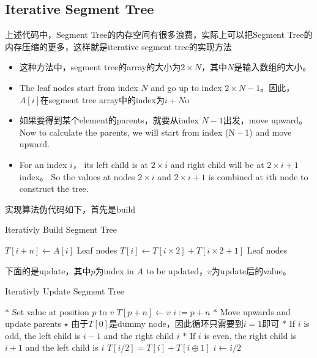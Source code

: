 \subsection{Iterative Segment Tree}
上述代码中，Segment Tree的内存空间有很多浪费，实际上可以把Segment Tree的内存压缩的更多，这样就是iterative segment tree的实现方法
\begin{itemize}
\item 这种方法中，segment tree的array的大小为$2\times N$，其中$N$是输入数组的大小。

\item The leaf nodes start from index $N$ and go up to index $ 2\times N -1 $。因此，$A[i]$在segment tree array中的index为$ i+N $o
\item 如果要得到某个element的parents，就要从index $ N-1 $出发，move upward。Now to calculate the parents, we will start from index (N – 1) and move upward. 
\item For an index $ i $， its left child is at $ 2\times i $ and right child will be at $ 2\times i + 1 $ index。 So the values at nodes $ 2\times i $ and $ 2\times i + 1 $ is combined at $i$th node to construct the tree.
\end{itemize}
实现算法伪代码如下，首先是build
\begin{algorithm}[H]
\caption{Iterativly Build Segment Tree}
\begin{algorithmic}[1]
\State $ T[i+n]\gets A[i] $ \Comment Leaf nodes
\EndFor
{}
\State $ T[i]\gets T[i\times 2] + T[i\times 2 +1] $ \Comment Leaf nodes
\EndFor
\EndProcedure
\end{algorithmic}
\end{algorithm}
下面的是update，其中$p$为index in $A$ to be updated，$v$为update后的value。
\begin{algorithm}[H]
\caption{Iterativly Update Segment Tree}
\begin{algorithmic}[1]
\State $\ast$ Set value at position $p$ to $v$
\State $ T[p+n]\gets v$
\State $i:=p+n$
\State $\ast$ Move upwards and update parents
\State $\star$ 由于$T[0]$是dummy node，因此循环只需要到$i=1$即可
\State $\ast$ If $i$ is odd, the left child is $ i-1 $ and the right child $ i $
\State $\ast$ If $i$ is even, the right child is $ i+1 $ and the left child is $ i $
\State $ T[i/2] = T[i] + T[i \oplus 1] $
\State $i\gets i /2 $
\EndWhile
\EndProcedure
\end{algorithmic}
\end{algorithm}
